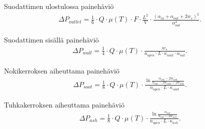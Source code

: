 Suodattimen ulostulossa painehäviö
\begin{align}
    \Delta P_{outlet} = \frac{1}{6} \cdot
    Q \cdot \mu(T) 
    \cdot F \cdot \frac{L^2}{V} \cdot \frac{(\alpha_{in}+\alpha_{out}+2 w_s)^2}{\alpha_{out}^4}.
    \label{eq:PDoutletopen}
\end{align}

Suodattimen sisällä painehäviö 
\begin{align}
    \Delta P_{wall} = \frac{1}{4} \cdot
    Q \cdot \mu(T) 
    \cdot \frac{w_s}
    {n_{open}\cdot L \cdot \kappa_{wall} \cdot \alpha_{out}}.
    \label{eq:PDfilterwall}
\end{align}

Nokikerroksen aiheuttama painehäviö
\begin{align}
    \Delta P_{soot} =  \frac{1}{8} \cdot
    Q \cdot \mu(T) \cdot 
    \frac{\ln{\frac{\alpha_{out}-2w_{ash}}{\alpha_{out}-2w_{soot}-2w_{ash}}}}
    {n_{open}\cdot L \cdot \kappa_{soot}}.
    \label{eq:PDsootlayer}
\end{align}

Tuhkakerroksen aiheuttama painehäviö
\begin{align}
    \Delta P_{ash} = \frac{1}{8} \cdot
    Q \cdot \mu(T) \cdot 
    \frac{\ln{\frac{\alpha_{out}}{\alpha_{out}-2w_{ash}}}}
    {n_{open}\cdot L \cdot \kappa_{ash}}.
    \label{eq:PDashlayer}
\end{align}
